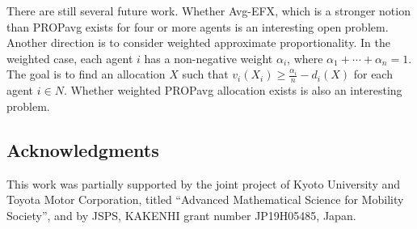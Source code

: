 \documentclass[11pt]{article}
\newcommand{\PROPavg}{\textsf{PROPavg}\xspace}
\begin{document}
There are still several future work.
Whether \textsf{Avg-EFX}, which is a stronger notion than
\PROPavg exists for four or more agents is an interesting open problem.
Another direction is to consider weighted approximate proportionality.
In the weighted case, each agent $i$ has a non-negative weight $\alpha_i$, where $\alpha_1+\cdots + \alpha_n=1$.
The goal is to find an allocation $X$ such that $v_i(X_i)\ge \frac{\alpha_i}{n}-d_i(X)$ for each agent $i\in N$.
Whether weighted \textsf{PROPavg} allocation exists is also an interesting problem.

\subsection*{Acknowledgments}
This work was partially supported by the joint project of Kyoto University
and Toyota Motor Corporation, titled ``Advanced Mathematical Science for
Mobility Society'', and
by JSPS, KAKENHI grant number JP19H05485, Japan.


\begin{comment}
\appendix
\section{Appendix}
\label{sec: }

\section{Figures}
\label{sec: }


\begin{figure}[htbp]
 \begin{minipage}[t]{0.5\hsize}
  \begin{center}
   \texttt{[image: ]}
 \end{center}
  \caption{}
  \label{fig: }
 \end{minipage}
\end{figure}
\end{comment}
\end{document}
